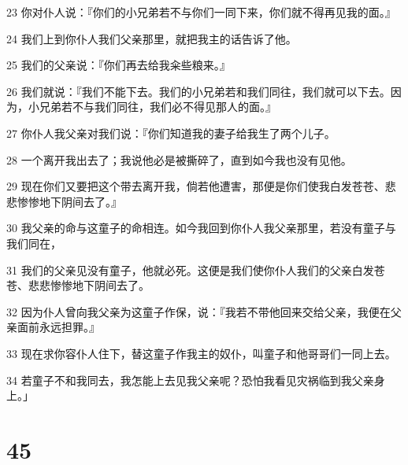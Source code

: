\par 23 你对仆人说：『你们的小兄弟若不与你们一同下来，你们就不得再见我的面。』
\par 24 我们上到你仆人我们父亲那里，就把我主的话告诉了他。
\par 25 我们的父亲说：『你们再去给我籴些粮来。』
\par 26 我们就说：『我们不能下去。我们的小兄弟若和我们同往，我们就可以下去。因为，小兄弟若不与我们同往，我们必不得见那人的面。』
\par 27 你仆人我父亲对我们说：『你们知道我的妻子给我生了两个儿子。
\par 28 一个离开我出去了；我说他必是被撕碎了，直到如今我也没有见他。
\par 29 现在你们又要把这个带去离开我，倘若他遭害，那便是你们使我白发苍苍、悲悲惨惨地下阴间去了。』
\par 30 我父亲的命与这童子的命相连。如今我回到你仆人我父亲那里，若没有童子与我们同在，
\par 31 我们的父亲见没有童子，他就必死。这便是我们使你仆人我们的父亲白发苍苍、悲悲惨惨地下阴间去了。
\par 32 因为仆人曾向我父亲为这童子作保，说：『我若不带他回来交给父亲，我便在父亲面前永远担罪。』
\par 33 现在求你容仆人住下，替这童子作我主的奴仆，叫童子和他哥哥们一同上去。
\par 34 若童子不和我同去，我怎能上去见我父亲呢？恐怕我看见灾祸临到我父亲身上。」

\chapter{45}

